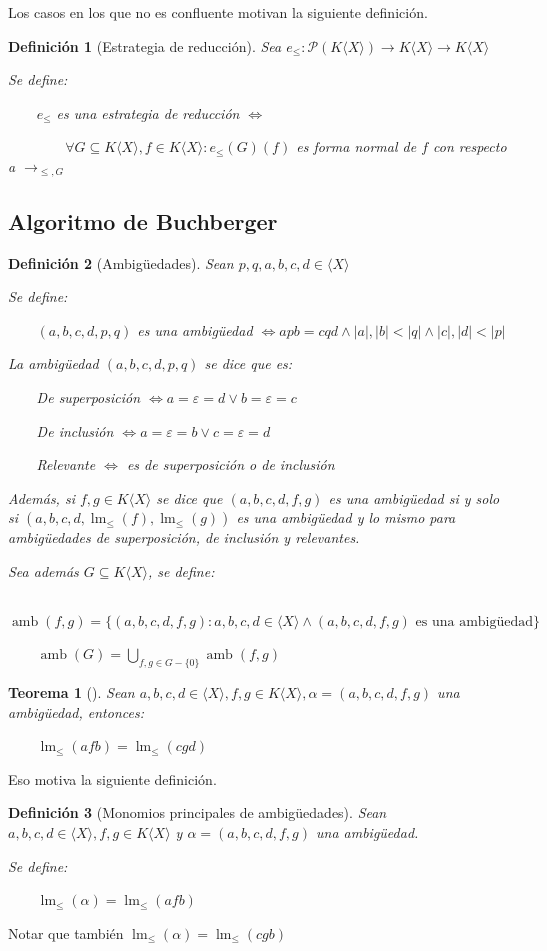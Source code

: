\documentclass{amsbook}
\theoremstyle{customstyle}
\newtheorem{definition}{Definición}[section]
\newtheorem{theorem}{Teorema}[section]
\newcommand{\definición}[2][]{
  \begin{definition}[#1]
  \setlength{\parindent}{2em} %
  #2
  \end{definition}
}
\newcommand{\teorema}[2][]{
  \begin{theorem}[#1]
  \setlength{\parindent}{2em} %
  #2
  \end{theorem}
}
\DeclareMathOperator{\lm}{lm}
\DeclareMathOperator{\amb}{amb}
\begin{document}
Los casos en los que no es confluente motivan la siguiente definición.

\definición[Estrategia de reducción] {
Sea $e_≤ : 𝒫(K⟨X⟩) → K⟨X⟩ → K⟨X⟩$

Se define:

    $e_≤$ es una estrategia de reducción $⇔$

        $∀G ⊆ K⟨X⟩, f ∈ K⟨X⟩ : e_≤(G)(f)$ es forma normal de $f$ con respecto a $→_{≤, G}$

}


\subsection{Algoritmo de Buchberger}

\definición[Ambigüedades] {
Sean $p, q, a, b, c, d ∈ ⟨X⟩$

Se define:

    $(a, b, c, d, p, q)$ es una ambigüedad $ ⇔ apb = cqd ∧ |a|, |b| < |q| ∧ |c|, |d| < |p|$

La ambigüedad $(a, b, c, d, p, q)$ se dice que es:

    De superposición $⇔ a = ε = d ∨ b = ε = c$

    De inclusión $⇔ a = ε = b ∨ c = ε = d$

    Relevante $⇔$ es de superposición o de inclusión

Además, si $f, g ∈ K⟨X⟩$ se dice que $(a, b, c, d, f, g)$ es una ambigüedad si y solo si $(a, b, c, d, \lm_≤{(f)}, \lm_≤{(g)})$ es una ambigüedad y lo mismo para ambigüedades de superposición, de inclusión y relevantes.

Sea además $G ⊆ K⟨X⟩$, se define:

    $\amb(f, g) = \{(a, b, c, d, f, g) : a, b, c, d ∈ ⟨X⟩ ∧ (a, b, c, d, f, g)\text{ es una ambigüedad}\}$

    $\amb(G) = \bigcup_{f, g ∈ G - \{0\}}{\amb(f, g)}$

}

\teorema[]{
Sean $a, b, c, d ∈ ⟨X⟩, f, g ∈ K⟨X⟩, α = (a, b, c, d, f, g)$ una ambigüedad, entonces:

    $\lm_≤{(afb)} = \lm_≤{(cgd)}$

}


Eso motiva la siguiente definición.

\definición[Monomios principales de ambigüedades] {
Sean $a, b, c, d ∈ ⟨X⟩, f, g ∈ K⟨X⟩$ y $α = (a, b, c, d, f, g)$ una ambigüedad.

Se define:

    $\lm_≤{(α)} = \lm_≤{(afb)}$
}
Notar que también $\lm_≤{(α)} = \lm_≤{(cgb)}$ %
\end{document}
